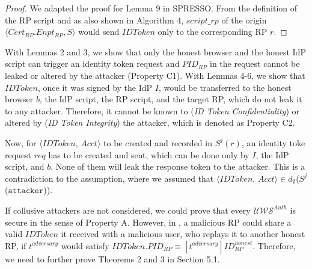 \begin{proof}
We adapted the proof for Lemma 9 in SPRESSO. 
From the definition of the RP script and as also shown in Algorithm 4, %
$script\_rp$ of the origin $\langle Cert_{RP}.Enpt_{RP}, S \rangle$ would send $IDToken$ only to the corresponding RP $r$. 
\end{proof}

\vspace{2mm}

With Lemmas 2 and 3, we show that only the honest browser and the honest IdP script can trigger an identity token request and $PID_{RP}$ in the request cannot be leaked or altered by the attacker (Property C1). 
With Lemmas 4-6, we show that $IDToken$, once it was signed by the IdP $I$, would be transferred to the honest browser $b$, the IdP script, the RP script, and the target RP, which do not leak it to any attacker. Therefore, it cannot be known to ({\em ID Token Confidentiality}) or altered by ({\em ID Token Integrity}) the attacker, which is denoted as Property C2.

Now, for $\langle IDToken$, $Acct \rangle$ to be created and recorded in $S^j(r)$, an identity toke request $req$ has to be created and sent, which can be done only by $I$, the IdP script, and $b$. None of them will leak the response token to the attacker. This is a contradiction to the assumption, where we assumed that $\langle IDToken$, $Acct \rangle \in d_{\emptyset}$($S^j$($\mathtt{attacker}$)). 

If collusive attackers are not considered, we could prove that every $\mathcal{U\!W\!S}^{Auth}$ is secure in the sense of Property A. However, in \usso, a malicious RP could share a valid $IDToken$ it received with a malicious user, who replays it to another honest RP, if $t^{adversary}$ would satisfy $IDToken.PID_{RP} \equiv [t^{adversary}]ID_{RP}^{honest}$. Therefore, we need to further prove Theorems 2 and 3 in Section 5.1.


